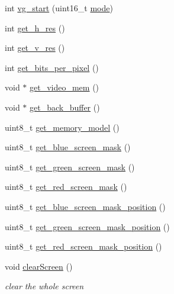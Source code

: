 \begin{DoxyCompactItemize}
\item 
int \mbox{\hyperlink{group__video_gac67621adf87bcebb04fab536c7245315}{vg\+\_\+start}} (uint16\+\_\+t \mbox{\hyperlink{group__timer_ggada782f3116a896caaa602b70c0c6d8b7af1982b2b77f9b0e7cd29e39b39d8a0b4}{mode}})
\item 
int \mbox{\hyperlink{group__video_ga3456b8539e4326dd13cbfc4f81b609f1}{get\+\_\+h\+\_\+res}} ()
\item 
int \mbox{\hyperlink{group__video_gaa6c3dbf699d3dda9444bdcd71bf85234}{get\+\_\+v\+\_\+res}} ()
\item 
int \mbox{\hyperlink{group__video_ga93c2bd40f276f3ac190868b704a0b460}{get\+\_\+bits\+\_\+per\+\_\+pixel}} ()
\item 
void $\ast$ \mbox{\hyperlink{group__video_ga1d04069f4e8b1556a7a1ed2cd95bfdea}{get\+\_\+video\+\_\+mem}} ()
\item 
void $\ast$ \mbox{\hyperlink{group__video_gabf77be88afd0e4b1165719c50c8896ba}{get\+\_\+back\+\_\+buffer}} ()
\item 
uint8\+\_\+t \mbox{\hyperlink{group__video_gaee3838c12a8543f378920ab8f6c3cae2}{get\+\_\+memory\+\_\+model}} ()
\item 
uint8\+\_\+t \mbox{\hyperlink{group__video_ga6929228fd26ebbf17efe05d9a72658a7}{get\+\_\+blue\+\_\+screen\+\_\+mask}} ()
\item 
uint8\+\_\+t \mbox{\hyperlink{group__video_ga0f0db7b6e31ed06140761c77d5b338ab}{get\+\_\+green\+\_\+screen\+\_\+mask}} ()
\item 
uint8\+\_\+t \mbox{\hyperlink{group__video_gac758200041aed05cff7f056c48456157}{get\+\_\+red\+\_\+screen\+\_\+mask}} ()
\item 
uint8\+\_\+t \mbox{\hyperlink{group__video_gae739d88cacef84ab9c419526fd0cc635}{get\+\_\+blue\+\_\+screen\+\_\+mask\+\_\+position}} ()
\item 
uint8\+\_\+t \mbox{\hyperlink{group__video_ga6212cfb721ba6c38f52de83d57788d69}{get\+\_\+green\+\_\+screen\+\_\+mask\+\_\+position}} ()
\item 
uint8\+\_\+t \mbox{\hyperlink{group__video_ga5ad95fa9656e4db3ac20e178769336f9}{get\+\_\+red\+\_\+screen\+\_\+mask\+\_\+position}} ()
\item 
void \mbox{\hyperlink{group__video_ga9d7e8af417b6d543da691e9c0e2f6f9f}{clear\+Screen}} ()
\begin{DoxyCompactList}\small\item\em clear the whole screen \end{DoxyCompactList}\item 

\end{DoxyCompactItemize}
